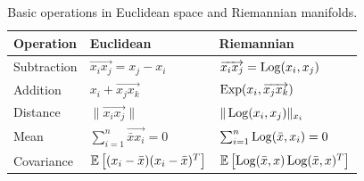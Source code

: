 \begin{table}
\begin{center}
    \begin{tabular}{| l | l | l | }
    \hline
    Operation & Euclidean & Riemannian  \\  \hline 
    \footnotesize Subtraction & $\overrightarrow{x_i x_j} = x_j - x_i$ & $\overrightarrow{x_i x_j} = \operatorname*{Log}(x_i,x_j)$ \\ 
    \footnotesize Addition & $x_i + \overrightarrow{x_j x_k}$ & $\operatorname*{Exp}(x_i,\overrightarrow{x_j x_k})$ \\     
    \footnotesize Distance  & $\| \overrightarrow{x_i x_j} \|$ & $\|\operatorname*{Log}(x_i,x_j) \|_{x_i}$ \\ 
    Mean  & $\sum_{i=1}^{n} \overrightarrow{\bar{x}x_{i}}=0$ & \footnotesize $\sum_{i=1}^{n} \operatorname*{Log}(\bar{x}, x_i)=0$  \\ 
    Covariance & \footnotesize$\mathbb{E} \left [ (x_i - \bar{x})(x_i - \bar{x})^{T} \right ]$&\footnotesize $\mathbb{E} \left [ \operatorname*{Log}(\bar{x}, x)\operatorname*{Log}(\bar{x}, x)^{T} \right ]$\\ [1ex] \hline 
  \end{tabular}
\end{center}
\caption[Basic operations on Riemannian manifolds]{Basic operations in Euclidean space and Riemannian manifolds.}
\label{tab:comp}
\end{table}


